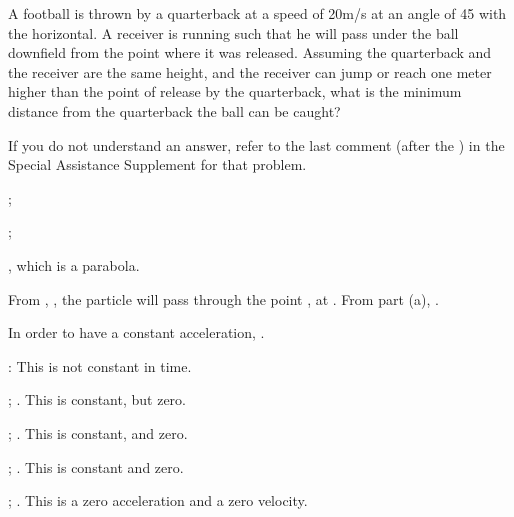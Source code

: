 {\begin{two-digit-list}
\item [15.] A football is thrown by a quarterback at a speed of
20\unit{m/s} at an angle of {45\degrees} with the horizontal.
A receiver is running such that he will pass under the
ball downfield from the point where it was released.
Assuming the quarterback and the receiver are the same
height, and the receiver can jump or reach one meter higher
than the point of release by the quarterback, what is the
minimum distance from the quarterback the ball can be caught?

\end{two-digit-list}

\BriefAnsNewPage

If you do not understand an answer, refer to the last comment (after
the ) in the Special Assistance Supplement for that problem.
\begin{two-digit-list}
\item [1.] \NullItem
\begin{one-digit-list}
\item [a.] ;
\item [  ] ;
\item [  ] ,
           which is a parabola.
\item [b.] From , , the
particle will pass through the point ,  at .
From part (a), .
\end{one-digit-list}

\item [2.] In order to have a constant acceleration, .
%
\begin{one-digit-list}
\item [a.] \newline
%
           :
           This is not constant in time.
\item [b.] ;
           .
           This is constant, but zero.
\item [c.] ;
           .
           This is constant, and \m{\neq} zero.
\item [d.] ;
           .
           This is constant and \m{\neq} zero.
\item [e.] ;
           .
           This is a zero acceleration and a zero velocity.
\end{one-digit-list}


\end{two-digit-list}}

